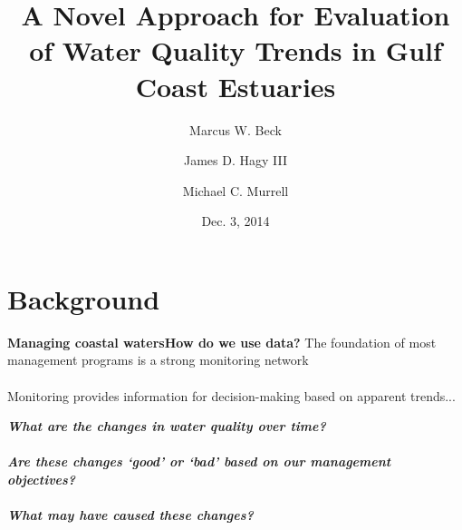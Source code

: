 \documentclass[serif]{beamer}\usepackage[]{graphicx}\usepackage[]{color}
\newcommand{\emtxt}[1]{\textbf{\textit{#1}}}
\begin{document}
\title[Evaluating Trends in Gulf Estuaries]{\textbf{A Novel Approach for Evaluation of Water Quality Trends in Gulf Coast Estuaries}}
\author[Beck, Hagy, Murrell]{Marcus W. Beck \and James D. Hagy III \and Michael C. Murrell}


\date{Dec. 3, 2014}


\begin{frame}[shrink]
\titlepage
\end{frame}

\section{Background}

\begin{frame}{\textbf{Managing coastal waters}}{\textbf{How do we use data?}}
The foundation of most management programs is a strong monitoring network \\~\\
Monitoring provides information for decision-making based on apparent trends...
\vspace{0.2in}
\begin{center}
\emtxt{What are the changes in water quality over time?}\\~\\
\emtxt{Are these changes `good' or `bad' based on our management objectives?}\\~\\
\emtxt{What may have caused these changes?}
\end{center}
\end{frame}
\end{document}
